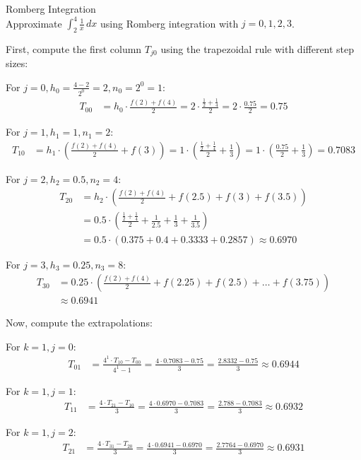 \begin{example2}{Romberg Integration}\\
Approximate $\int_2^4 \frac{1}{x} \, dx$ using Romberg integration with $j = 0, 1, 2, 3$.

First, compute the first column $T_{j0}$ using the trapezoidal rule with different step sizes:

For $j = 0, h_0 = \frac{4-2}{2^0} = 2, n_0 = 2^0 = 1$:
\begin{align*}
T_{00} &= h_0 \cdot \frac{f(2) + f(4)}{2} = 2 \cdot \frac{\frac{1}{2} + \frac{1}{4}}{2} = 2 \cdot \frac{0.75}{2} = 0.75
\end{align*}

For $j = 1, h_1 = 1, n_1 = 2$:
\begin{align*}
T_{10} &= h_1 \cdot \left(\frac{f(2) + f(4)}{2} + f(3)\right) = 1 \cdot \left(\frac{\frac{1}{2} + \frac{1}{4}}{2} + \frac{1}{3}\right) = 1 \cdot \left(\frac{0.75}{2} + \frac{1}{3}\right) = 0.7083
\end{align*}

For $j = 2, h_2 = 0.5, n_2 = 4$:
\begin{align*}
T_{20} &= h_2 \cdot \left(\frac{f(2) + f(4)}{2} + f(2.5) + f(3) + f(3.5)\right)\\
&= 0.5 \cdot \left(\frac{\frac{1}{2} + \frac{1}{4}}{2} + \frac{1}{2.5} + \frac{1}{3} + \frac{1}{3.5}\right)\\
&= 0.5 \cdot (0.375 + 0.4 + 0.3333 + 0.2857) \approx 0.6970
\end{align*}

For $j = 3, h_3 = 0.25, n_3 = 8$:
\begin{align*}
T_{30} &= 0.25 \cdot \left(\frac{f(2) + f(4)}{2} + f(2.25) + f(2.5) + \ldots + f(3.75)\right)\\
&\approx 0.6941
\end{align*}

Now, compute the extrapolations:

For $k = 1, j = 0$:
\begin{align*}
T_{01} &= \frac{4^1 \cdot T_{10} - T_{00}}{4^1 - 1} = \frac{4 \cdot 0.7083 - 0.75}{3} = \frac{2.8332 - 0.75}{3} \approx 0.6944
\end{align*}

For $k = 1, j = 1$:
\begin{align*}
T_{11} &= \frac{4 \cdot T_{21} - T_{10}}{3} = \frac{4 \cdot 0.6970 - 0.7083}{3} = \frac{2.788 - 0.7083}{3} \approx 0.6932
\end{align*}

For $k = 1, j = 2$:
\begin{align*}
T_{21} &= \frac{4 \cdot T_{31} - T_{20}}{3} = \frac{4 \cdot 0.6941 - 0.6970}{3} = \frac{2.7764 - 0.6970}{3} \approx 0.6931
\end{align*}


\end{example2}
